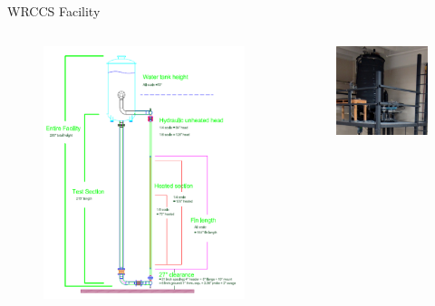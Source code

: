 \documentclass[10pt,t,xcolor=table]{UWMadBeamer}
\begin{document}
\begin{frame}{WRCCS Facility}
    \begin{columns}
        \begin{column}{0.71\paperwidth}
            \begin{figure}
                \centering
                \includegraphics[keepaspectratio,height=0.71\paperheight]{WRCCS_CAD}
            \end{figure}
        \end{column}
        \hfill
        \begin{column}{0.28\paperwidth}
            \begin{figure}
                \centering
                \includegraphics[keepaspectratio,height=0.35\paperheight]{WRCCS_Tank}\\

\end{figure}
\end{column}
\end{columns}
\end{frame}
\end{document}
